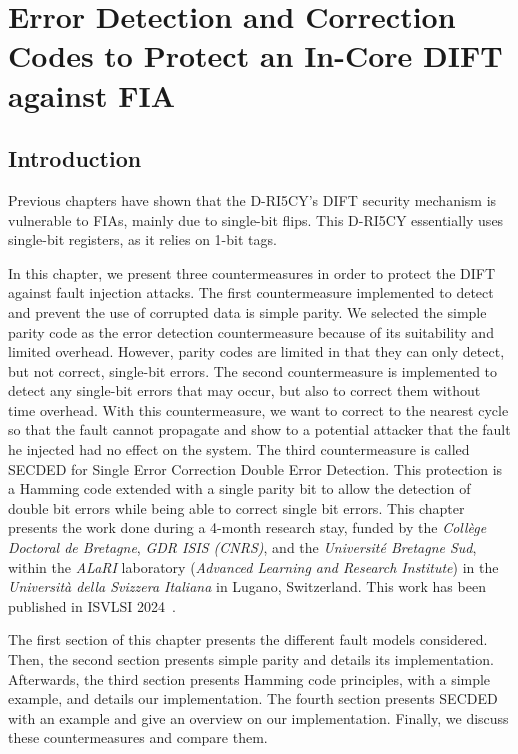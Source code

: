 \chapter{Error Detection and Correction Codes to Protect an In-Core DIFT against FIA}
\label{chapter:countermeasures}
\minitoc

\section{Introduction}
Previous chapters have shown that the D-RI5CY's DIFT security mechanism is vulnerable to FIAs, mainly due to single-bit flips. This D-RI5CY essentially uses single-bit registers, as it relies on 1-bit tags.

In this chapter, we present three countermeasures in order to protect the DIFT against fault injection attacks.
The first countermeasure implemented to detect and prevent the use of corrupted data is simple parity. We selected the simple parity code as the error detection countermeasure because of its suitability and limited overhead. However, parity codes are limited in that they can only detect, but not correct, single-bit errors.
The second countermeasure is implemented to detect any single-bit errors that may occur, but also to correct them without time overhead. With this countermeasure, we want to correct to the nearest cycle so that the fault cannot propagate and show to a potential attacker that the fault he injected had no effect on the system.
The third countermeasure is called SECDED for Single Error Correction Double Error Detection. This protection is a Hamming code extended with a single parity bit to allow the detection of double bit errors while being able to correct single bit errors.
This chapter presents the work done during a 4-month research stay, funded by the \textit{Collège Doctoral de Bretagne}, \textit{GDR ISIS (CNRS)}, and the \textit{Université Bretagne Sud}, within the \textit{ALaRI} laboratory (\textit{Advanced Learning and Research Institute}) in the \textit{Università della Svizzera Italiana} in Lugano, Switzerland.
This work has been published in ISVLSI 2024~\cite{PRLG-24-isvlsi}.

The first section of this chapter presents the different fault models considered. Then, the second section presents simple parity and details its implementation. Afterwards, the third section presents Hamming code principles, with a simple example, and details our implementation. The fourth section presents SECDED with an example and give an overview on our implementation. Finally, we discuss these countermeasures and compare them.

